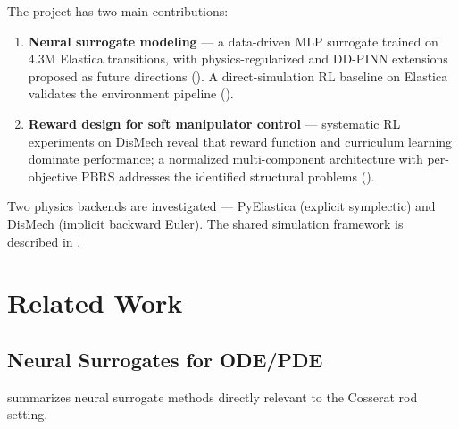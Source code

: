\documentclass[11pt]{article}
\begin{document}
The project has two main contributions:
\begin{enumerate}
  \item \textbf{Neural surrogate modeling} --- a data-driven MLP surrogate trained on 4.3M Elastica transitions, with physics-regularized and DD-PINN extensions proposed as future directions ().
  A direct-simulation RL baseline on Elastica validates the environment pipeline ().
  \item \textbf{Reward design for soft manipulator control} --- systematic RL experiments on DisMech reveal that reward function and curriculum learning dominate performance; a normalized multi-component architecture with per-objective PBRS addresses the identified structural problems ().
\end{enumerate}

Two physics backends are investigated --- PyElastica (explicit symplectic) and DisMech (implicit backward Euler).
The shared simulation framework is described in .

\section{Related Work}
\label{sec:related}

\subsection{Neural Surrogates for ODE/PDE}
\label{sec:related:surrogates}

 summarizes neural surrogate methods directly relevant to the Cosserat rod setting.
\end{document}
